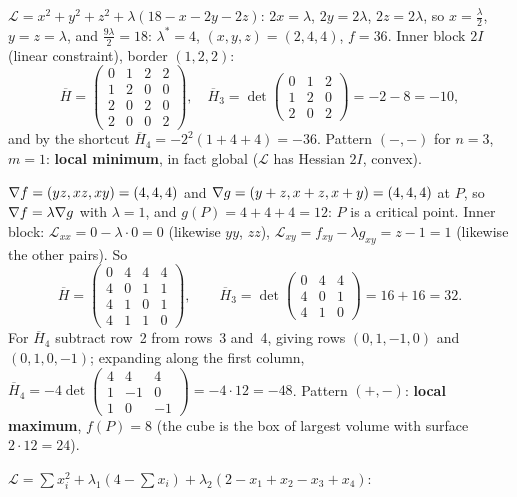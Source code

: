 \begin{solutions}
  \item $\mathcal{L}=x^{2}+y^{2}+z^{2}+\lambda(18-x-2y-2z)$: $2x=\lambda$,
        $2y=2\lambda$, $2z=2\lambda$, so $x=\tfrac\lambda2$, $y=z=\lambda$,
        and $\tfrac{9\lambda}{2}=18$: $\lambda^*=4$, $(x,y,z)=(2,4,4)$,
        $f=36$. Inner block $2I$ (linear constraint), border $(1,2,2)$:
        \[
          \overline{H}=\begin{pmatrix}0&1&2&2\\1&2&0&0\\2&0&2&0\\2&0&0&2\end{pmatrix},\quad
          \overline{H}_3=\det\begin{pmatrix}0&1&2\\1&2&0\\2&0&2\end{pmatrix}=-2-8=-10,
        \]
        and by the shortcut $\overline{H}_4=-2^{2}(1+4+4)=-36$. Pattern
        $(-,-)$ for $n=3$, $m=1$: \textbf{local minimum}, in fact global
        ($\mathcal{L}$ has Hessian $2I$, convex).
  \item $\nabla f=(yz,xz,xy)=(4,4,4)$ and $\nabla g=(y+z,x+z,x+y)=(4,4,4)$
        at $P$, so $\nabla f=\lambda\nabla g$ with $\lambda=1$, and
        $g(P)=4+4+4=12$: $P$ is a critical point. Inner block:
        $\mathcal{L}_{xx}=0-\lambda\cdot0=0$ (likewise $yy$, $zz$),
        $\mathcal{L}_{xy}=f_{xy}-\lambda g_{xy}=z-1=1$ (likewise the other
        pairs). So
        \[
          \overline{H}=\begin{pmatrix}0&4&4&4\\4&0&1&1\\4&1&0&1\\4&1&1&0\end{pmatrix},\qquad
          \overline{H}_3=\det\begin{pmatrix}0&4&4\\4&0&1\\4&1&0\end{pmatrix}=16+16=32 .
        \]
        For $\overline{H}_4$ subtract row~2 from rows~3 and~4, giving rows
        $(0,1,-1,0)$ and $(0,1,0,-1)$; expanding along the first column,
        $\overline{H}_4=-4\det\begin{pmatrix}4&4&4\\1&-1&0\\1&0&-1\end{pmatrix}=-4\cdot12=-48$.
        Pattern $(+,-)$: \textbf{local maximum}, $f(P)=8$ (the cube is the
        box of largest volume with surface $2\cdot12=24$).
  \item $\mathcal{L}=\sum x_i^{2}+\lambda_1(4-\sum x_i)+\lambda_2(2-x_1+x_2-x_3+x_4)$:

\end{solutions}
